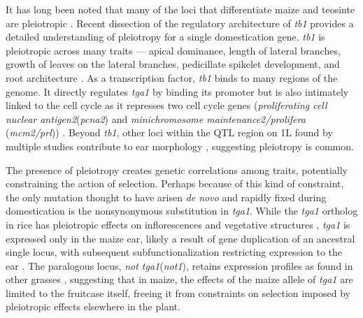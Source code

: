 \documentclass[a4paper]{article}
\newcommand{\mcs}[1]{\todo[size=\tiny, color=magenta!20]{#1}}
\newcommand{\jri}[1]{\todo[size=\tiny, color=green!20]{#1}}
\begin{document}
﻿It has long been noted that many of the loci that differentiate maize and teosinte are pleiotropic \citep{collins1920, beadle1939, mangelsdorf1939, langham1940}.
Recent dissection of the regulatory architecture of \textit{tb1} provides a detailed understanding of pleiotropy for a single domestication gene.
﻿\textit{tb1} is pleiotropic across many traits --- apical dominance, length of lateral branches, growth of leaves on the lateral branches, pedicillate spikelet development, and root architecture \citep{hubbard2002, gaudin2014}.
As a transcription factor, \textit{tb1} binds to many regions of the genome.
It directly regulates \textit{tga1} by binding its promoter but is also intimately linked to the cell cycle as it represses two cell cycle genes (\textit{proliferating cell nuclear antigen2}(\textit{pcna2}) and \textit{minichromosome maintenance2/prolifera} (\textit{mcm2/prl})) \citep{studer2017}.
﻿Beyond \textit{tb1}, other loci within the QTL region on 1L found by multiple studies \citep{doebley1991, doebley1993, briggs2007} contribute to ear morphology \citep{studer2011fract, yang2016}, suggesting pleiotropy is common.

﻿The presence of pleiotropy creates genetic correlations among traits, potentially constraining the action of selection. \jri{tweak?}
Perhaps because of this kind of constraint, the only mutation thought to have arisen \textit{de novo} and rapidly fixed during domestication is the nonsynonymous substitution in \textit{tga1}.
﻿While the \textit{tga1} ortholog in rice has pleiotropic effects on inflorescences and vegetative structures \citep{preston2012, wang2015}, \textit{tga1} is expressed only in the maize ear, likely a result of gene duplication of an ancestral single locus, with subsequent subfunctionalization  restricting expression to the ear \citep{preston2012, wang2015}.
The paralogous locus, \textit{not tga1}(\textit{not1}), retains expression profiles as found in other grasses \citep{wang2011, wang2012}, suggesting that in maize, the effects of the maize allele of \textit{tga1} are limited to the fruitcase itself, freeing it from constraints on selection imposed by pleiotropic effects elsewhere in the plant.
\end{document}
